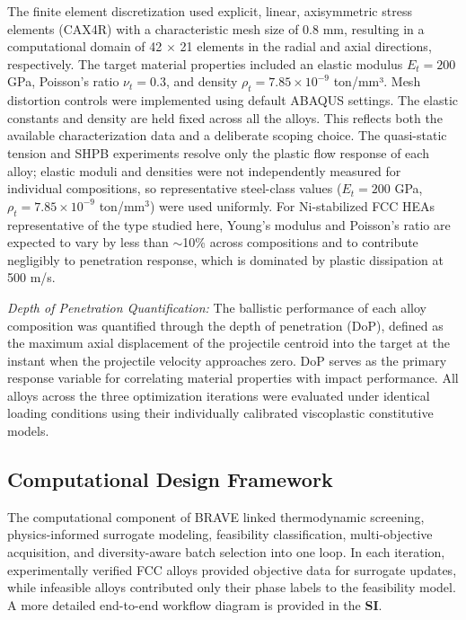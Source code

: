 The finite element discretization used explicit, linear, axisymmetric stress elements (CAX4R) with a characteristic mesh size of 0.8 mm, resulting in a computational domain of 42 $\times$ 21 elements in the radial and axial directions, respectively. The target material properties included an elastic modulus $E_t = 200$ GPa, Poisson's ratio $\nu_t = 0.3$, and density $\rho_t = 7.85 \times 10^{-9}$ ton/mm³. Mesh distortion controls were implemented using default ABAQUS settings. The elastic constants and density are held fixed across all the alloys. This reflects both the available characterization data and a deliberate scoping choice. The quasi-static tension and SHPB experiments resolve only the plastic flow response of each alloy; elastic moduli and densities were not independently measured for individual compositions, so representative steel-class values ($E_t = 200$ GPa, $\rho_t = 7.85 \times 10^{-9}$ ton/mm$^3$) were used uniformly. For Ni-stabilized FCC HEAs representative of the type studied here, Young's modulus and Poisson's ratio are expected to vary by less than $\sim$10\% across compositions and to contribute negligibly to penetration response, which is dominated by plastic dissipation at 500 m/s. 


\emph{Depth of Penetration Quantification:} The ballistic performance of each alloy composition was quantified through the depth of penetration (DoP), defined as the maximum axial displacement of the projectile centroid into the target at the instant when the projectile velocity approaches zero. DoP serves as the primary response variable for correlating material properties with impact performance. All alloys across the three optimization iterations were evaluated under identical loading conditions using their individually calibrated viscoplastic constitutive models.


\subsection{Computational Design Framework}

The computational component of BRAVE linked thermodynamic screening, physics-informed surrogate modeling, feasibility classification, multi-objective acquisition, and diversity-aware batch selection into one loop. In each iteration, experimentally verified FCC alloys provided objective data for surrogate updates, while infeasible alloys contributed only their phase labels to the feasibility model. A more detailed end-to-end workflow diagram is provided in the \textbf{SI}.

